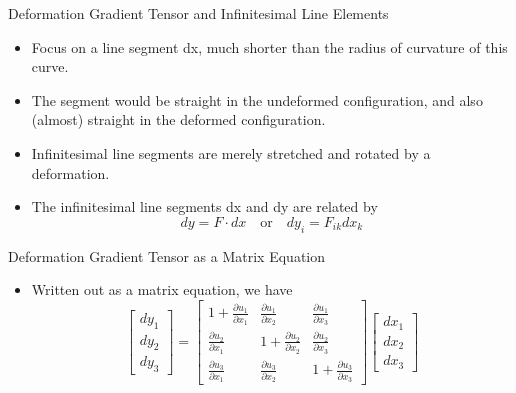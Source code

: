 \documentclass[aspectratio=169,11pt]{beamer}
\begin{document}
\begin{frame}{Deformation Gradient Tensor and Infinitesimal Line Elements}
  \begin{itemize}
    \item   Focus on a line segment dx, much shorter than the radius of curvature of this curve.
    \item   The segment would be straight in the undeformed configuration, and also (almost) straight in the deformed configuration.
    \item   Infinitesimal line segments are merely stretched and rotated by a deformation.
    \item   The infinitesimal line segments dx and dy are related by
    $$ dy = F \cdot dx \quad \text{or} \quad dy_i = F_{ik} dx_k $$
  \end{itemize}
\end{frame}

\begin{frame}{Deformation Gradient Tensor as a Matrix Equation}
    \begin{itemize}
        \item   Written out as a matrix equation, we have
        $$
        \begin{bmatrix}
          dy_1 \\
          dy_2 \\
          dy_3
        \end{bmatrix} =
        \begin{bmatrix}
          1 + \frac{\partial u_1}{\partial x_1} & \frac{\partial u_1}{\partial x_2} & \frac{\partial u_1}{\partial x_3} \\
          \frac{\partial u_2}{\partial x_1} & 1 + \frac{\partial u_2}{\partial x_2} & \frac{\partial u_2}{\partial x_3} \\
          \frac{\partial u_3}{\partial x_1} & \frac{\partial u_3}{\partial x_2} & 1 + \frac{\partial u_3}{\partial x_3}
        \end{bmatrix}
        \begin{bmatrix}
          dx_1 \\
          dx_2 \\
          dx_3
        \end{bmatrix}
        $$
    \end{itemize}
\end{frame}
\end{document}

